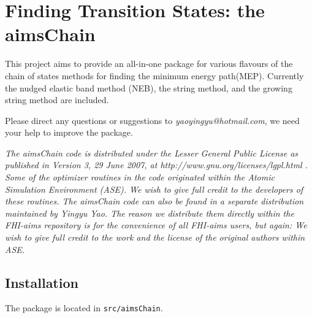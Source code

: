 \newcommand{\chainkey}[1]
{\hyperlink{aimsChain#1}{\texttt{#1}}}

\newcommand{\chainkeydef}[2]
{

\centerline{\rule{1.0\textwidth}{1pt}}
\hypertarget{aimsChain#1}{\textbf{Tag: \texttt{#1}}{ \color{filename_color} (chain.in)}}
\\[2ex] \hspace*{0.05\textwidth}
\begin{minipage}{0.92\textwidth}
  #2
\end{minipage} \\

\vspace{1pt}
}


\section{Finding Transition States: the aimsChain}
This project aims to provide an all-in-one package for various flavours of the chain of states methods for finding the minimum energy path(MEP). Currently the nudged elastic band method (NEB)\cite{NEBORI,NEBTAN}, the string method\cite{STRORI}, and the growing string method\cite{GSMoriginal} are included. 

Please direct any questions or suggestions to \textit{yaoyingyu@hotmail.com}, we need your help to improve the package.

\emph{The aimsChain code is distributed under the Lesser General
  Public License as published in Version 3, 29 June 2007, at
  http://www.gnu.org/licenses/lgpl.html . Some of the optimizer
  routines in the code originated within the Atomic Simulation
  Environment (ASE). We wish to give full credit to the developers of
  these routines. The aimsChain code can also be found in a separate
  distribution maintained by Yingyu Yao. The reason we distribute them
  directly within the FHI-aims repository is for the convenience of
  all FHI-aims users, but again: We wish to give full credit to the
  work and the license of the original authors within ASE.}

\subsection{Installation}
The package is located in \texttt{src/aimsChain}. 

